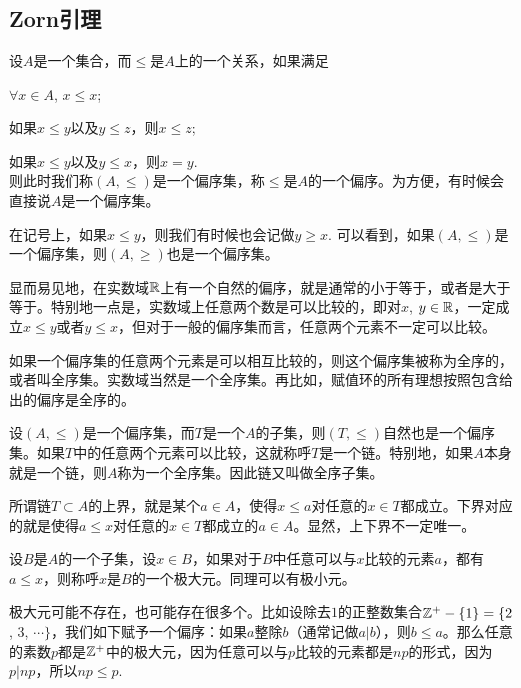 \appendix
\renewcommand{\thepara}{\Alph{chapter}.\arabic{para}}

\chapter{}

\section{Zorn引理}
\para 设$A$是一个集合，而$\leq$是$A$上的一个关系，如果满足

\begin{compactenum}[~~~(1)]
\item $\forall x\in A$, $x\leq x$;
\item 如果$x\leq y$以及$y\leq z$，则$x\leq z$;
\item 如果$x\leq y$以及$y \leq x$，则$x=y$.\\则此时我们称$(A,\leq)$是一个偏序集，称$\leq$是$A$的一个偏序。为方便，有时候会直接说$A$是一个偏序集。
\end{compactenum}

在记号上，如果$x\leq y$，则我们有时候也会记做$y\geq x$. 可以看到，如果$(A,\leq)$是一个偏序集，则$(A,\geq)$也是一个偏序集。

显而易见地，在实数域$\mathbb{R}$上有一个自然的偏序，就是通常的小于等于，或者是大于等于。特别地一点是，实数域上任意两个数是可以比较的，即对$x$, $y\in \mathbb{R}$，一定成立$x\leq y$或者$y\leq x$，但对于一般的偏序集而言，任意两个元素不一定可以比较。

如果一个偏序集的任意两个元素是可以相互比较的，则这个偏序集被称为全序的，或者叫全序集。实数域当然是一个全序集。再比如，赋值环的所有理想按照包含给出的偏序是全序的。

\para 设$(A,\leq)$是一个偏序集，而$T$是一个$A$的子集，则$(T,\leq)$自然也是一个偏序集。如果$T$中的任意两个元素可以比较，这就称呼$T$是一个链。特别地，如果$A$本身就是一个链，则$A$称为一个全序集。因此链又叫做全序子集。

\para 所谓链$T\subset A$的上界，就是某个$a\in A$，使得$x\leq a$对任意的$x\in T$都成立。下界对应的就是使得$a\leq x$对任意的$x\in T$都成立的$a\in A$。显然，上下界不一定唯一。

\para 设$B$是$A$的一个子集，设$x\in B$，如果对于$B$中任意可以与$x$比较的元素$a$，都有$a\leq x$，则称呼$x$是$B$的一个极大元。同理可以有极小元。

极大元可能不存在，也可能存在很多个。比如设除去$1$的正整数集合$\mathbb{Z}^+-\{1\}=\{2$, $3$, $\cdots\}$，我们如下赋予一个偏序：如果$a$整除$b$（通常记做$a|b$），则$b\leq a$。那么任意的素数$p$都是$\mathbb{Z}^+$中的极大元，因为任意可以与$p$比较的元素都是$np$的形式，因为$p|np$，所以$np\leq p$.

